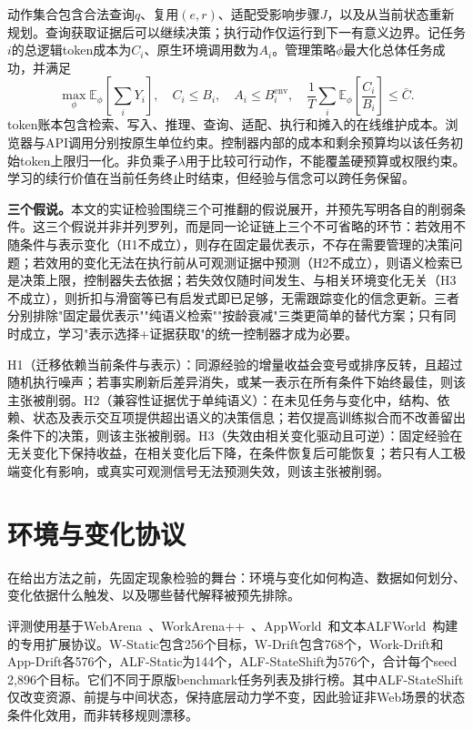 \documentclass[sigconf,anonymous,review]{acmart}
\newcommand{\E}{\mathbb{E}}
\theoremstyle{zhplain}
\begin{document}
动作集合包含合法查询\(q\)、复用\((e,r)\)、适配受影响步骤\(J\)，以及从当前状态重新规划。查询获取证据后可以继续决策；执行动作仅运行到下一有意义边界。记任务\(i\)的总逻辑token成本为\(C_i\)、原生环境调用数为\(A_i\)。管理策略\(\phi\)最大化总体任务成功，并满足
\begin{equation}
\max_{\phi}\E_{\phi}\!\left[\sum_iY_i\right],\quad
 C_i\le B_i,\quad A_i\le B_i^{\mathrm{env}},\quad
 \frac1T\sum_i\E_{\phi}\!\left[\frac{C_i}{B_i}\right]\le\bar C.
\label{eq:objective}
\end{equation}
token账本包含检索、写入、推理、查询、适配、执行和摊入的在线维护成本。浏览器与API调用分别按原生单位约束。控制器内部的成本和剩余预算均以该任务初始token上限归一化。非负乘子\(\lambda\)用于比较可行动作，不能覆盖硬预算或权限约束。学习的续行价值在当前任务终止时结束，但经验与信念可以跨任务保留。

\textbf{三个假说。}本文的实证检验围绕三个可推翻的假说展开，并预先写明各自的削弱条件。这三个假说并非并列罗列，而是同一论证链上三个不可省略的环节：若效用不随条件与表示变化（H1不成立），则存在固定最优表示，不存在需要管理的决策问题；若效用的变化无法在执行前从可观测证据中预测（H2不成立），则语义检索已是决策上限，控制器失去依据；若失效仅随时间发生、与相关环境变化无关（H3不成立），则折扣与滑窗等已有启发式即已足够，无需跟踪变化的信念更新。三者分别排除"固定最优表示""纯语义检索""按龄衰减"三类更简单的替代方案；只有同时成立，学习"表示选择+证据获取"的统一控制器才成为必要。

H1（迁移依赖当前条件与表示）：同源经验的增量收益会变号或排序反转，且超过随机执行噪声；若事实刷新后差异消失，或某一表示在所有条件下始终最佳，则该主张被削弱。H2（兼容性证据优于单纯语义）：在未见任务与变化中，结构、依赖、状态及表示交互项提供超出语义的决策信息；若仅提高训练拟合而不改善留出条件下的决策，则该主张被削弱。H3（失效由相关变化驱动且可逆）：固定经验在无关变化下保持收益，在相关变化后下降，在条件恢复后可能恢复；若只有人工极端变化有影响，或真实可观测信号无法预测失效，则该主张被削弱。

\section{环境与变化协议}
\label{sec:protocol}
在给出方法之前，先固定现象检验的舞台：环境与变化如何构造、数据如何划分、变化依据什么触发、以及哪些替代解释被预先排除。

评测使用基于WebArena~\cite{webarena}、WorkArena++~\cite{workarena}、AppWorld~\cite{appworld}和文本ALFWorld~\cite{alfworld}构建的专用扩展协议。W-Static包含256个目标，W-Drift包含768个，Work-Drift和App-Drift各576个，ALF-Static为144个，ALF-StateShift为576个，合计每个seed 2,896个目标。它们不同于原版benchmark任务列表及排行榜。其中ALF-StateShift仅改变资源、前提与中间状态，保持底层动力学不变，因此验证非Web场景的状态条件化效用，而非转移规则漂移。
\end{document}
